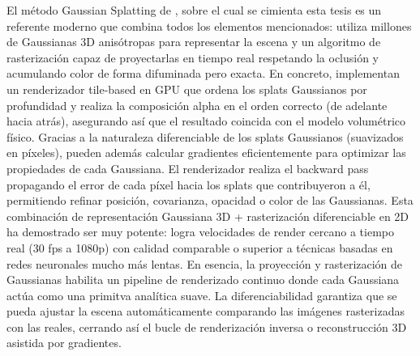 El método Gaussian Splatting de \cite{kerbl20233d}, sobre el cual se cimienta esta tesis es un referente moderno que combina todos los elementos mencionados: 
utiliza millones de 
Gaussianas 3D anisótropas para representar la escena y un algoritmo de rasterización capaz de proyectarlas en tiempo real respetando la oclusión 
y acumulando color de forma difuminada pero exacta. En concreto, implementan un renderizador tile-based en GPU que ordena los splats Gaussianos 
por profundidad y realiza la composición alpha en el orden correcto (de adelante hacia atrás), asegurando así que el resultado coincida con el modelo 
volumétrico físico. Gracias a la naturaleza diferenciable de los splats Gaussianos (suavizados en píxeles), pueden además calcular gradientes 
eficientemente para optimizar las propiedades de cada Gaussiana. El renderizador realiza el backward pass propagando el error de cada píxel 
hacia los splats que contribuyeron a él, permitiendo refinar posición, covarianza, opacidad o color de las Gaussianas. Esta combinación de 
representación Gaussiana 3D + rasterización diferenciable en 2D ha demostrado ser muy potente: logra velocidades de render cercano a tiempo real 
(30 fps a 1080p) con calidad comparable o superior a técnicas basadas en redes neuronales mucho más lentas. En esencia, la proyección y 
rasterización de Gaussianas habilita un pipeline de renderizado continuo donde cada Gaussiana actúa como una primitva analítica suave. La 
diferenciabilidad garantiza que se pueda ajustar la escena automáticamente comparando las imágenes rasterizadas
con las reales, cerrando así el bucle de renderización inversa o reconstrucción 3D asistida por gradientes.


